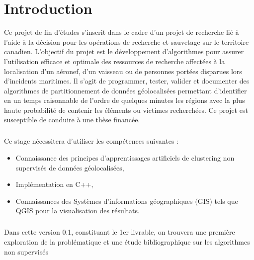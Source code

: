 \chapter*{Introduction}
\label{chap:introduction}

Ce projet de fin d'études s'inscrit dans le cadre d’un projet de recherche lié à l’aide à la décision pour les opérations de recherche et sauvetage sur le territoire canadien. L’objectif du projet est le développement d’algorithmes pour assurer l’utilisation efficace et optimale des ressources de recherche affectées à la localisation d'un aéronef, d'un vaisseau ou de personnes portées disparues lors d'incidents maritimes. Il s'agit de programmer, tester, valider et documenter des algorithmes de partitionnement de données géolocalisées permettant d’identifier en un temps raisonnable de l'ordre de quelques minutes les régions avec la plus haute probabilité de contenir les éléments ou victimes recherchées. Ce projet est susceptible de conduire à une thèse financée. 

\paragraph{}
Ce stage nécessitera d'utiliser les compétences suivantes : 
\begin{itemize}
	\item Connaissance des principes d'apprentissages artificiels de clustering non supervisés de données géolocalisées,
	\item Implémentation en C++,
	\item Connaissances des Systèmes d'informations géographiques (GIS) tels que QGIS
	pour la visualisation des résultats. 
\end{itemize}  

\paragraph{}
Dans cette version 0.1, constituant le 1er livrable, on trouvera une première exploration de la problématique et une étude bibliographique sur les algorithmes non supervisés 
